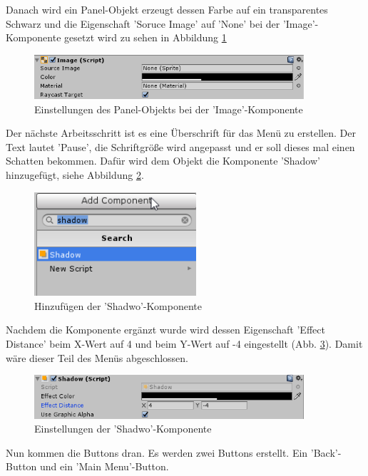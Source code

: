 Danach wird ein Panel-Objekt erzeugt dessen Farbe auf ein transparentes Schwarz und die Eigenschaft 'Soruce Image' auf 'None' bei der 'Image'-Komponente gesetzt wird zu sehen in Abbildung \ref{Panel Pause}

\begin{figure}[H]
	\includegraphics[width=10cm]{images/PanelPause.png}
	\caption{Einstellungen des Panel-Objekts bei der 'Image'-Komponente}
	\label{Panel Pause}
\end{figure}

Der nächste Arbeitsschritt ist es eine Überschrift für das Menü zu erstellen. Der Text lautet 'Pause', die Schriftgröße wird angepasst und er soll dieses mal einen Schatten bekommen. Dafür wird dem Objekt die Komponente 'Shadow' hinzugefügt, siehe Abbildung \ref{addshadow}.

\begin{figure}[H]
	\includegraphics[width=6cm]{images/addshadow.png}
	\caption{Hinzufügen der 'Shadwo'-Komponente}
	\label{addshadow}
\end{figure}

Nachdem die Komponente ergänzt wurde wird dessen Eigenschaft 'Effect Distance' beim X-Wert auf 4 und beim Y-Wert auf -4 eingestellt (Abb. \ref{shadowSetup}). Damit wäre dieser Teil des Menüs abgeschlossen.
\begin{figure}[H]
	\includegraphics[width=10cm]{images/shadowSetup.png}
	\caption{Einstellungen der 'Shadwo'-Komponente}
	\label{shadowSetup}
\end{figure}

Nun kommen die Buttons dran. Es werden zwei Buttons erstellt. Ein  'Back'-Button und ein 'Main Menu'-Button. 

